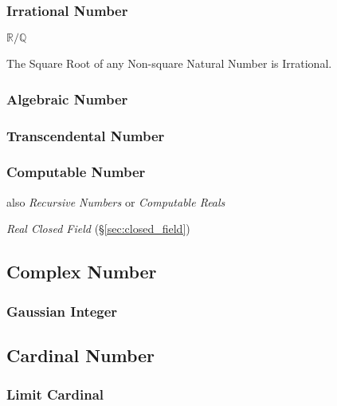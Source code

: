 \subsubsection{Irrational Number}\label{sec:irrational}

$\mathbb{R}/\mathbb{Q}$

The Square Root of any Non-square Natural Number is Irrational.



\subsubsection{Algebraic Number}\label{sec:algebraic_number}

\subsubsection{Transcendental Number}\label{sec:transcendental}

\subsubsection{Computable Number}\label{sec:computable_real}

also \emph{Recursive Numbers} or \emph{Computable Reals}

\emph{Real Closed Field} (\S\ref{sec:closed_field})



\subsection{Complex Number}\label{sec:complex_number}

\subsubsection{Gaussian Integer}\label{sec:gaussian_integer}



\subsection{Cardinal Number}\label{sec:cardinal_number}

\subsubsection{Limit Cardinal}\label{sec:limit_cardinal}

